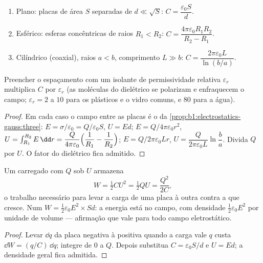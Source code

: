 \begin{proposition}\label{prop:b1:potential-capacitors:three}
\begin{enumerate}
  \item Plano: placas de área $S$ separadas de $d \ll \sqrt S$:
        $C = \dfrac{\varepsilon_0S}{d}$.
  \item Esférico: esferas concêntricas de raios $R_1 < R_2$:
        $C = \dfrac{4\pi\varepsilon_0R_1R_2}{R_2 - R_1}$.
  \item Cilíndrico (coaxial), raios $a < b$, comprimento $L \gg b$:
        $C = \dfrac{2\pi\varepsilon_0L}{\ln(b/a)}$.
\end{enumerate}
Preencher o espaçamento com um isolante de permissividade relativa
$\varepsilon_r$ multiplica $C$ por $\varepsilon_r$ (as moléculas do dielétrico se
polarizam e enfraquecem o campo; $\varepsilon_r = 2$ a $10$ para os plásticos e
o vidro comuns, e $80$ para a água).
\end{proposition}

\begin{proof}
Em cada caso o campo entre as placas é o da
\cref{prop:b1:electrostatics-gauss:three}: $E = \sigma/\varepsilon_0 = Q/\varepsilon_0S$,
$U = Ed$; $E = Q/4\pi\varepsilon_0r^2$, $U = \int_{R_1}^{R_2}E\,\dd r = \dfrac{Q}{4\pi\varepsilon_0}
\Bigl(\dfrac1{R_1} - \dfrac1{R_2}\Bigr)$; $E = Q/2\pi\varepsilon_0Lr$, $U =
\dfrac{Q}{2\pi\varepsilon_0L}\ln\dfrac ba$. Divida $Q$ por $U$. O fator do
dielétrico fica admitido.
\end{proof}

\begin{theorem}\label{thm:b1:potential-capacitors:energy}
Um  carregado com $Q$ sob $U$ armazena
\[
W = \tfrac12 CU^2 = \tfrac12 QU = \frac{Q^2}{2C} ,
\]
o trabalho necessário para levar a carga de uma placa à outra
contra a  que cresce. Num  $W = \tfrac12\varepsilon_0E^2
\times Sd$: a energia está no campo, com densidade $\tfrac12\varepsilon_0E^2$
por unidade de volume --- afirmação que vale para todo campo
eletrostático.
\end{theorem}

\begin{proof}
Levar $\dd q$ da placa negativa à positiva quando a carga
vale $q$ custa $\dd W = (q/C)\,\dd q$; integre de $0$ a $Q$. Depois
substitua $C = \varepsilon_0S/d$ e $U = Ed$; a densidade geral fica admitida.
\end{proof}

